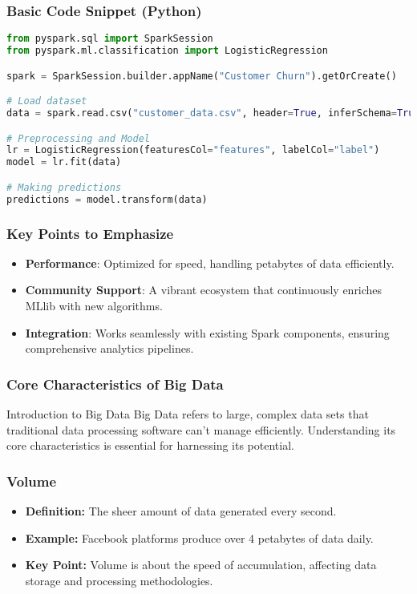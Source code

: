 \documentclass[aspectratio=169]{beamer}
\begin{document}
\begin{frame}[fragile]
    \frametitle{Basic Code Snippet (Python)}
    \begin{lstlisting}[language=python]
from pyspark.sql import SparkSession
from pyspark.ml.classification import LogisticRegression

spark = SparkSession.builder.appName("Customer Churn").getOrCreate()

# Load dataset
data = spark.read.csv("customer_data.csv", header=True, inferSchema=True)

# Preprocessing and Model
lr = LogisticRegression(featuresCol="features", labelCol="label")
model = lr.fit(data)

# Making predictions
predictions = model.transform(data)
    \end{lstlisting}
\end{frame}

\begin{frame}[fragile]
    \frametitle{Key Points to Emphasize}
    \begin{itemize}
        \item \textbf{Performance}: Optimized for speed, handling petabytes of data efficiently.
        \item \textbf{Community Support}: A vibrant ecosystem that continuously enriches MLlib with new algorithms.
        \item \textbf{Integration}: Works seamlessly with existing Spark components, ensuring comprehensive analytics pipelines.
    \end{itemize}
\end{frame}

\begin{frame}[fragile]
    \frametitle{Core Characteristics of Big Data}
    \begin{block}{Introduction to Big Data}
        Big Data refers to large, complex data sets that traditional data processing software can’t manage efficiently. Understanding its core characteristics is essential for harnessing its potential.
    \end{block}
\end{frame}

\begin{frame}[fragile]
    \frametitle{Volume}
    \begin{itemize}
        \item \textbf{Definition:} The sheer amount of data generated every second.
        \item \textbf{Example:} Facebook platforms produce over 4 petabytes of data daily.
        \item \textbf{Key Point:} Volume is about the speed of accumulation, affecting data storage and processing methodologies.
    \end{itemize}
\end{frame}
\end{document}
